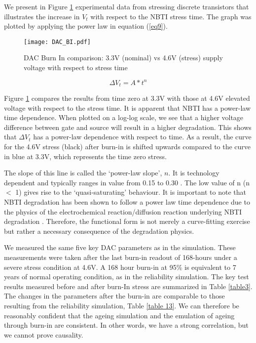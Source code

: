 \documentclass[11pt,a4paper]{article}
\begin{document}
We present in Figure \ref{figure 10} experimental data from stressing discrete transistors that illustrates the increase in $V_t$ with respect to the NBTI stress time. The graph was plotted by applying the power law in equation (\ref{eq9}).
\begin{figure}[t]
\centering
\texttt{[image: DAC\_BI.pdf]}

\caption{DAC Burn In comparison: 3.3V (nominal) vs 4.6V (stress) supply voltage with respect to stress time}
\label{figure 10}
\end{figure}

\begin{equation} 
\label{eq9}
\Delta V_{t} = A*t^n
\label{eq77}	
\end{equation}

Figure \ref{figure 10} compares the results from time zero at 3.3V with those at 4.6V elevated voltage with respect to the stress time.
It is apparent that NBTI has a power-law time dependence. When plotted on a log-log scale, we see that a higher voltage difference between gate and source will result in a higher degradation. This shows that $\Delta V_t$ has a power-law dependence with respect to time. As a result, the curve for the 4.6V stress (black) after burn-in is shifted upwards compared to the curve in blue at 3.3V,  which represents the time zero stress. 

The slope of this line is called the `power-law slope', $n$. It is technology dependent and typically ranges in value from 0.15 to 0.30 \cite{Schroder}. The low value of n (n $<$ 1) gives rise to the `quasi-saturating' behaviour. It is important to note that NBTI degradation has been shown to follow a power law time dependence due to the physics of the electrochemical reaction/diffusion reaction underlying NBTI degradation \cite{Schroder}. Therefore, the functional form is not merely a curve-fitting exercise but rather a necessary consequence of the degradation physics.







We measured the same five key DAC parameters as in the simulation. These measurements were taken after the last burn-in readout of 168-hours under a severe stress condition at 4.6V. A 168 hour burn-in at 95\% is equivalent to 7 years of normal operating condition, as in the reliability simulation. The key test results measured before and after burn-In stress are summarized in Table \ref{table3}. The changes in the parameters after the burn-in are comparable to those resulting from the reliability simulation, Table \ref{table 13}. We can therefore be reasonably confident that the ageing simulation and the emulation of ageing through burn-in are consistent. In other words, we have a strong correlation, but we cannot prove causality.
\end{document}
